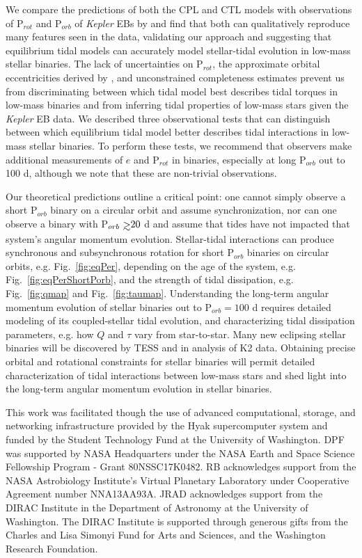 \documentclass[twocolumn]{aastex61}
\def\gsim{~\rlap{$>$}{\lower 1.0ex\hbox{$\sim$}}}
\newcommand{\kepler}[0]{\textit{Kepler}\xspace}
\begin{document}
We compare the predictions of both the CPL and CTL models with observations of P$_{rot}$ and P$_{orb}$ of \kepler EBs by \citet{Lurie2017} and find that both can qualitatively reproduce many features seen in the data, validating our approach and suggesting that equilibrium tidal models can accurately model stellar-tidal evolution in low-mass stellar binaries. The lack of uncertainties on P$_{rot}$, the approximate orbital eccentricities derived by \citet{Lurie2017}, and unconstrained completeness estimates prevent us from discriminating between which tidal model best describes tidal torques in low-mass binaries and from inferring tidal properties of low-mass stars given the \kepler EB data.  We described three observational tests that can distinguish between which equilibrium tidal model better describes tidal interactions in low-mass stellar binaries.  To perform these tests, we recommend that observers make additional measurements of $e$ and P$_{rot}$ in binaries, especially at long P$_{orb}$ out to 100 d, although we note that these are non-trivial observations.

Our theoretical predictions outline a critical point: one cannot simply observe a short P$_{orb}$ binary on a circular orbit and assume synchronization, nor can one observe a binary with P$_{orb} \gsim 20$ d and assume that tides have not impacted that system's angular momentum evolution.  Stellar-tidal interactions can produce synchronous and subsynchronous rotation for short P$_{orb}$ binaries on circular orbits, e.g. Fig.~\ref{fig:eqPer}, depending on the age of the system, e.g. Fig.~\ref{fig:eqPerShortPorb}, and the strength of tidal dissipation, e.g. Fig.~\ref{fig:qmap} and Fig.~\ref{fig:taumap}.  Understanding the long-term angular momentum evolution of stellar binaries out to P$_{orb} = 100$ d requires detailed modeling of its coupled-stellar tidal evolution, and characterizing tidal dissipation parameters, e.g. how $Q$ and $\tau$ vary from star-to-star. Many new eclipsing stellar binaries will be discovered by TESS \citep[e.g.][]{Sullivan2015,Matson2018} and in analysis of K2 data.  Obtaining precise orbital and rotational constraints for stellar binaries will permit detailed characterization of tidal interactions between low-mass stars and shed light into the long-term angular momentum evolution in stellar binaries. 

\acknowledgments
This work was facilitated though the use of advanced computational, storage, and networking infrastructure provided by the Hyak supercomputer system and funded by the Student Technology Fund at the University of Washington. DPF was supported by NASA Headquarters under the NASA Earth and Space Science Fellowship Program - Grant 80NSSC17K0482.  RB acknowledges support from the NASA Astrobiology Institute's Virtual Planetary Laboratory under Cooperative Agreement number NNA13AA93A. JRAD acknowledges support from the DIRAC Institute in the Department of Astronomy at the University of Washington. The DIRAC Institute is supported through generous gifts from the Charles and Lisa Simonyi Fund for Arts and Sciences, and the Washington Research Foundation.
\end{document}
